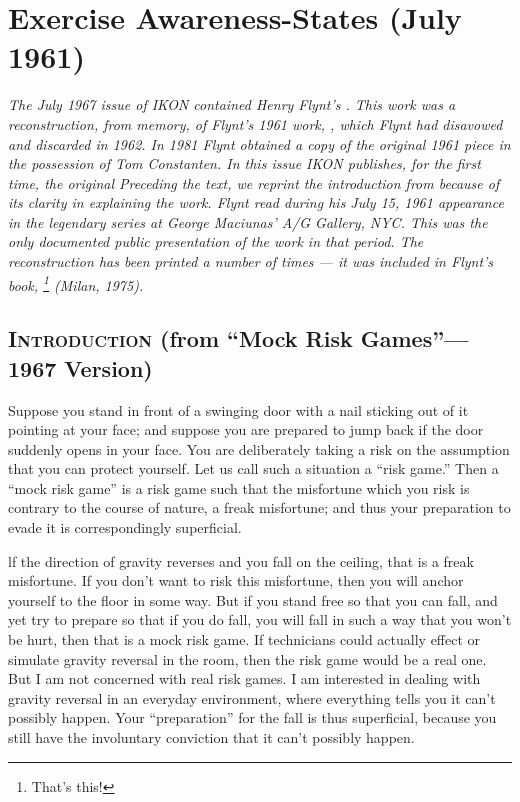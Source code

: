 \chapter[Exercise Awareness-States (July 1961)][Exercise Awareness-States]{Exercise Awareness-States (July 1961)}

{
\itshape
The July 1967 issue of IKON contained Henry Flynt's .
This work was a reconstruction, from memory, of Flynt's 1961 work, 
, which Flynt had disavowed and discarded in 1962. 
In 1981 Flynt obtained a copy of the original 1961 piece in the possession 
of Tom Constanten. In this issue IKON publishes, for the first time, the 
original  Preceding the text, we reprint the 
introduction from  because of its clarity in explaining the 
work. Flynt read  during his July 15, 1961 
appearance in the legendary series at George Maciunas' A/G Gallery, NYC. 
This was the only documented public presentation of the work in that period. 
The reconstruction  has been printed a number of 
times --- it was included in Flynt's book, \footnote{That's this!}
(Milan, 1975). 
}


\section*{\textsc{Introduction} (from \enquote{Mock Risk Games}---1967 Version)}


Suppose you stand in front of a swinging door with a nail sticking out of it 
pointing at your face; and suppose you are prepared to jump back if the door 
suddenly opens in your face. You are deliberately taking a risk on the 
assumption that you can protect yourself. Let us call such a situation a \enquote{risk game.} Then a \enquote{mock risk game} is a risk game such that the misfortune 
which you risk is contrary to the course of nature, a freak misfortune; and 
thus your preparation to evade it is correspondingly superficial. 

lf the direction of gravity reverses and you fall on the ceiling, that is a freak 
misfortune. If you don't want to risk this misfortune, then you will anchor 
yourself to the floor in some way. But if you stand free so that you can fall, 
and yet try to prepare so that if you do fall, you will fall in such a way that 
you won't be hurt, then that is a mock risk game. If technicians could actually 
effect or simulate gravity reversal in the room, then the risk game would be 
a real one. But I am not concerned with real risk games. I am interested in 
dealing with gravity reversal in an everyday environment, where everything 
tells you it can't possibly happen. Your \enquote{preparation} for the fall is thus 
superficial, because you still have the involuntary conviction that it can't 
possibly happen. 

